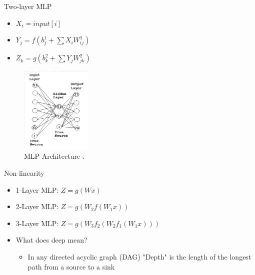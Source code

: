 \begin{frame}{Two-layer MLP}
    \begin{itemize}
        \item $X_i = input[i]$
        \item $Y_j = f(b^1_j + \sum{X_i W^1_{ij}})$
        \item $Z_k = g(b^2_k + \sum{Y_j W^2_{jk}})$
    \end{itemize}
	\begin{figure}[H]
		\centering
		\includegraphics[width=0.3\textwidth]{Images/MLP2.png}
		\caption{MLP Architecture \cite{Gonna Replace It/}.}
	\end{figure}
\end{frame}

\begin{frame}{Non-linearity}
\begin{itemize}
    \item 1-Layer MLP: $Z = g(Wx)$
    \item 2-Layer MLP: $Z = g(W_2f(W_1x))$
    \item 3-Layer MLP: $Z = g(W_3f_2(W_2f_1(W_1x)))$
    \item What does deep mean?
    \begin{itemize}
        \item In any directed acyclic graph (DAG) "Depth" is the length of the longest path from a source to a sink
    \end{itemize}
\end{itemize}
    
\end{frame}

